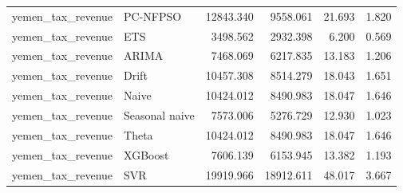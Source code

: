 \begin{longtable}{llrrrr}
yemen\_tax\_revenue & PC-NFPSO & 12843.340 & 9558.061 & 21.693 & 1.820 \\
yemen\_tax\_revenue & ETS & 3498.562 & 2932.398 & 6.200 & 0.569 \\
yemen\_tax\_revenue & ARIMA & 7468.069 & 6217.835 & 13.183 & 1.206 \\
yemen\_tax\_revenue & Drift & 10457.308 & 8514.279 & 18.043 & 1.651 \\
yemen\_tax\_revenue & Naive & 10424.012 & 8490.983 & 18.047 & 1.646 \\
yemen\_tax\_revenue & Seasonal naive & 7573.006 & 5276.729 & 12.930 & 1.023 \\
yemen\_tax\_revenue & Theta & 10424.012 & 8490.983 & 18.047 & 1.646 \\
yemen\_tax\_revenue & XGBoost & 7606.139 & 6153.945 & 13.382 & 1.193 \\
yemen\_tax\_revenue & SVR & 19919.966 & 18912.611 & 48.017 & 3.667 \\
\hline
\end{longtable}
\normalsize
